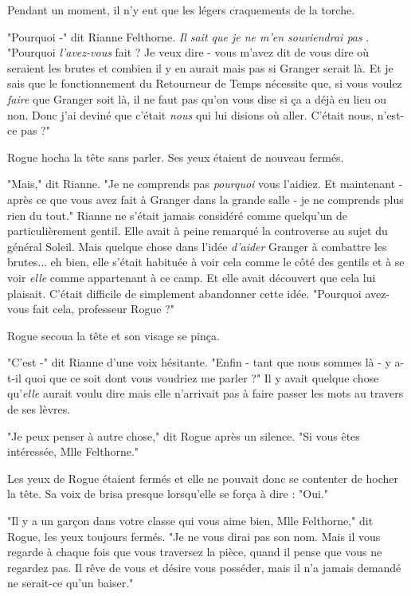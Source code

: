 Pendant un moment, il n'y eut que les légers craquements de la torche.

"Pourquoi -" dit Rianne Felthorne. \emph{Il sait que je ne m'en souviendrai pas} . "Pourquoi \emph{l'avez-vous}  fait ? Je veux dire - vous m'avez dit de vous dire où seraient les brutes et combien il y en aurait mais pas si Granger serait là. Et je sais que le fonctionnement du Retourneur de Temps nécessite que, si vous voulez \emph{faire}  que Granger soit là, il ne faut pas qu'on vous dise si ça a déjà eu lieu ou non. Donc j'ai deviné que c'était \emph{nous}  qui lui disions où aller. C'était nous, n'est-ce pas ?"

Rogue hocha la tête sans parler. Ses yeux étaient de nouveau fermés.

"Mais," dit Rianne. "Je ne comprends pas \emph{pourquoi}  vous l'aidiez. Et maintenant - après ce que vous avez fait à Granger dans la grande salle - je ne comprends plus rien du tout." Rianne ne s'était jamais considéré comme quelqu'un de particulièrement gentil. Elle avait à peine remarqué la controverse au sujet du général Soleil. Mais quelque chose dans l'idée \emph{d'aider}  Granger à combattre les brutes... eh bien, elle s'était habituée à voir cela comme le côté des gentils et à se voir \emph{elle}  comme appartenant à ce camp. Et elle avait découvert que cela lui plaisait. C'était difficile de simplement abandonner cette idée. "Pourquoi avez-vous fait cela, professeur Rogue ?"

Rogue secoua la tête et son visage se pinça.

"C'est -" dit Rianne d'une voix hésitante. "Enfin - tant que nous sommes là - y a-t-il quoi que ce soit dont vous voudriez me parler ?" Il y avait quelque chose qu'\emph{elle}  aurait voulu dire mais elle n'arrivait pas à faire passer les mots au travers de ses lèvres.

"Je peux penser à autre chose," dit Rogue après un silence. "Si vous êtes intéressée, Mlle Felthorne."

Les yeux de Rogue étaient fermés et elle ne pouvait donc se contenter de hocher la tête. Sa voix de brisa presque lorsqu'elle se força à dire : "Oui."

"Il y a un garçon dans votre classe qui vous aime bien, Mlle Felthorne," dit Rogue, les yeux toujours fermés. "Je ne vous dirai pas son nom. Mais il vous regarde à chaque fois que vous traversez la pièce, quand il pense que vous ne regardez pas. Il rêve de vous et désire vous posséder, mais il n'a jamais demandé ne serait-ce qu'un baiser."

